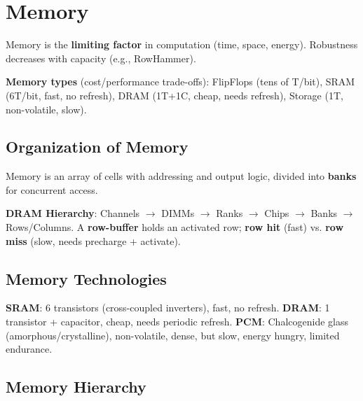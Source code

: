 \section{Memory}

\begin{remark}
	Memory is the \textbf{limiting factor} in computation (time, space, energy). Robustness decreases with capacity (e.g., RowHammer).
\end{remark}

\begin{definition}
	\textbf{Memory types} (cost/performance trade-offs):
	FlipFlops (tens of T/bit), SRAM (6T/bit, fast, no refresh), DRAM (1T+1C, cheap, needs refresh), Storage (1T, non-volatile, slow).
\end{definition}

\subsection{Organization of Memory}

\begin{definition}
	Memory is an array of cells with addressing and output logic, divided into \textbf{banks} for concurrent access.
\end{definition}

\begin{definition}
	\textbf{DRAM Hierarchy}: Channels $\to$ DIMMs $\to$ Ranks $\to$ Chips $\to$ Banks $\to$ Rows/Columns. A \textbf{row-buffer} holds an activated row; \textbf{row hit} (fast) vs. \textbf{row miss} (slow, needs precharge + activate).
\end{definition}

\subsection{Memory Technologies}

\begin{definition}
	\textbf{SRAM}: 6 transistors (cross-coupled inverters), fast, no refresh.
	\textbf{DRAM}: 1 transistor + capacitor, cheap, needs periodic refresh.
	\textbf{PCM}: Chalcogenide glass (amorphous/crystalline), non-volatile, dense, but slow, energy hungry, limited endurance.
\end{definition}

\subsection{Memory Hierarchy}

